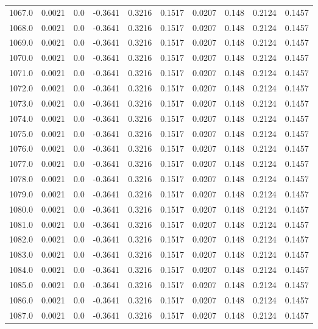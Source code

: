 \begin{longtable}{lrrrrrrrrr}
1067.0 & 0.0021 & 0.0 & -0.3641 & 0.3216 & 0.1517 & 0.0207 & 0.148 & 0.2124 & 0.1457 \\
1068.0 & 0.0021 & 0.0 & -0.3641 & 0.3216 & 0.1517 & 0.0207 & 0.148 & 0.2124 & 0.1457 \\
1069.0 & 0.0021 & 0.0 & -0.3641 & 0.3216 & 0.1517 & 0.0207 & 0.148 & 0.2124 & 0.1457 \\
1070.0 & 0.0021 & 0.0 & -0.3641 & 0.3216 & 0.1517 & 0.0207 & 0.148 & 0.2124 & 0.1457 \\
1071.0 & 0.0021 & 0.0 & -0.3641 & 0.3216 & 0.1517 & 0.0207 & 0.148 & 0.2124 & 0.1457 \\
1072.0 & 0.0021 & 0.0 & -0.3641 & 0.3216 & 0.1517 & 0.0207 & 0.148 & 0.2124 & 0.1457 \\
1073.0 & 0.0021 & 0.0 & -0.3641 & 0.3216 & 0.1517 & 0.0207 & 0.148 & 0.2124 & 0.1457 \\
1074.0 & 0.0021 & 0.0 & -0.3641 & 0.3216 & 0.1517 & 0.0207 & 0.148 & 0.2124 & 0.1457 \\
1075.0 & 0.0021 & 0.0 & -0.3641 & 0.3216 & 0.1517 & 0.0207 & 0.148 & 0.2124 & 0.1457 \\
1076.0 & 0.0021 & 0.0 & -0.3641 & 0.3216 & 0.1517 & 0.0207 & 0.148 & 0.2124 & 0.1457 \\
1077.0 & 0.0021 & 0.0 & -0.3641 & 0.3216 & 0.1517 & 0.0207 & 0.148 & 0.2124 & 0.1457 \\
1078.0 & 0.0021 & 0.0 & -0.3641 & 0.3216 & 0.1517 & 0.0207 & 0.148 & 0.2124 & 0.1457 \\
1079.0 & 0.0021 & 0.0 & -0.3641 & 0.3216 & 0.1517 & 0.0207 & 0.148 & 0.2124 & 0.1457 \\
1080.0 & 0.0021 & 0.0 & -0.3641 & 0.3216 & 0.1517 & 0.0207 & 0.148 & 0.2124 & 0.1457 \\
1081.0 & 0.0021 & 0.0 & -0.3641 & 0.3216 & 0.1517 & 0.0207 & 0.148 & 0.2124 & 0.1457 \\
1082.0 & 0.0021 & 0.0 & -0.3641 & 0.3216 & 0.1517 & 0.0207 & 0.148 & 0.2124 & 0.1457 \\
1083.0 & 0.0021 & 0.0 & -0.3641 & 0.3216 & 0.1517 & 0.0207 & 0.148 & 0.2124 & 0.1457 \\
1084.0 & 0.0021 & 0.0 & -0.3641 & 0.3216 & 0.1517 & 0.0207 & 0.148 & 0.2124 & 0.1457 \\
1085.0 & 0.0021 & 0.0 & -0.3641 & 0.3216 & 0.1517 & 0.0207 & 0.148 & 0.2124 & 0.1457 \\
1086.0 & 0.0021 & 0.0 & -0.3641 & 0.3216 & 0.1517 & 0.0207 & 0.148 & 0.2124 & 0.1457 \\
1087.0 & 0.0021 & 0.0 & -0.3641 & 0.3216 & 0.1517 & 0.0207 & 0.148 & 0.2124 & 0.1457 \\

\end{longtable}
